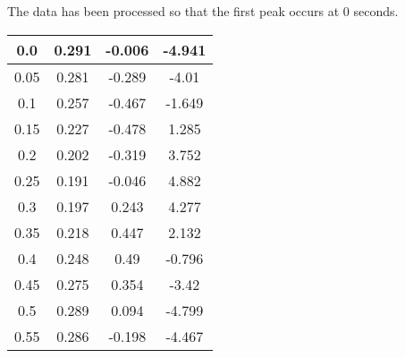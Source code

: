 The data has been processed so that the first peak occurs at 0 seconds.
\begin{multicols}{2}

\begin{longtable}{|c|c|c|c|}
    \hline
    0.0      & 0.291        & -0.006                                 & -4.941                                       \\
    \hline
    0.05     & 0.281        & -0.289                                 & -4.01                                        \\
    \hline
    0.1      & 0.257        & -0.467                                 & -1.649                                       \\
    \hline
    0.15     & 0.227        & -0.478                                 & 1.285                                        \\
    \hline
    0.2      & 0.202        & -0.319                                 & 3.752                                        \\
    \hline
    0.25     & 0.191        & -0.046                                 & 4.882                                        \\
    \hline
    0.3      & 0.197        & 0.243                                  & 4.277                                        \\
    \hline
    0.35     & 0.218        & 0.447                                  & 2.132                                        \\
    \hline
    0.4      & 0.248        & 0.49                                   & -0.796                                       \\
    \hline
    0.45     & 0.275        & 0.354                                  & -3.42                                        \\
    \hline
    0.5      & 0.289        & 0.094                                  & -4.799                                       \\
    \hline
    0.55     & 0.286        & -0.198                                 & -4.467                                       \\

\end{longtable}
\end{multicols}
